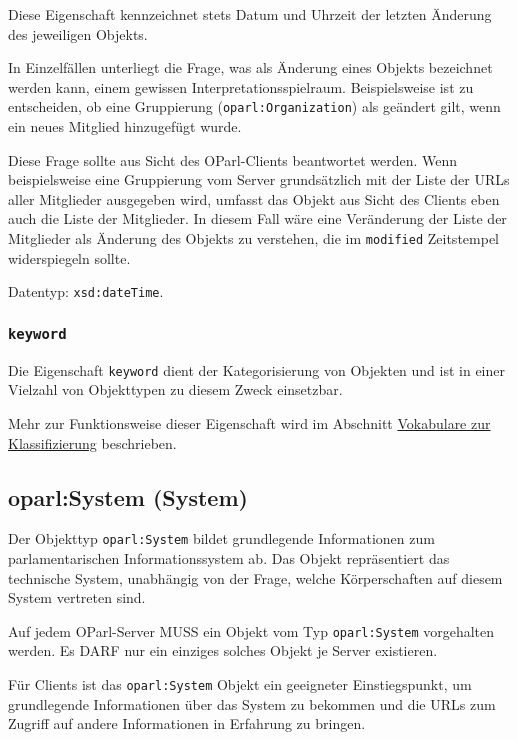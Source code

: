 \documentclass[,a4paper]{article}
\begin{document}
Diese Eigenschaft kennzeichnet stets Datum und Uhrzeit der letzten
Änderung des jeweiligen Objekts.

In Einzelfällen unterliegt die Frage, was als Änderung eines Objekts
bezeichnet werden kann, einem gewissen Interpretationsspielraum.
Beispielsweise ist zu entscheiden, ob eine Gruppierung
(\texttt{oparl:Organization}) als geändert gilt, wenn ein neues Mitglied
hinzugefügt wurde.

Diese Frage sollte aus Sicht des OParl-Clients beantwortet werden. Wenn
beispielsweise eine Gruppierung vom Server grundsätzlich mit der Liste
der URLs aller Mitglieder ausgegeben wird, umfasst das Objekt aus Sicht
des Clients eben auch die Liste der Mitglieder. In diesem Fall wäre eine
Veränderung der Liste der Mitglieder als Änderung des Objekts zu
verstehen, die im \texttt{modified} Zeitstempel widerspiegeln sollte.

Datentyp: \texttt{xsd:dateTime}.

\subsubsection{\texttt{keyword}}\label{keyword}

Die Eigenschaft \texttt{keyword} dient der Kategorisierung von Objekten
und ist in einer Vielzahl von Objekttypen zu diesem Zweck einsetzbar.

Mehr zur Funktionsweise dieser Eigenschaft wird im Abschnitt
\hyperref[vokabulareux5fklassifizierung]{Vokabulare zur Klassifizierung}
beschrieben.

\subsection{oparl:System (System)}\label{oparlux5fsystem}

Der Objekttyp \texttt{oparl:System} bildet grundlegende Informationen
zum parlamentarischen Informationssystem ab. Das Objekt repräsentiert
das technische System, unabhängig von der Frage, welche Körperschaften
auf diesem System vertreten sind.

Auf jedem OParl-Server MUSS ein Objekt vom Typ \texttt{oparl:System}
vorgehalten werden. Es DARF nur ein einziges solches Objekt je Server
existieren.

Für Clients ist das \texttt{oparl:System} Objekt ein geeigneter
Einstiegspunkt, um grundlegende Informationen über das System zu
bekommen und die URLs zum Zugriff auf andere Informationen in Erfahrung
zu bringen.
\end{document}
